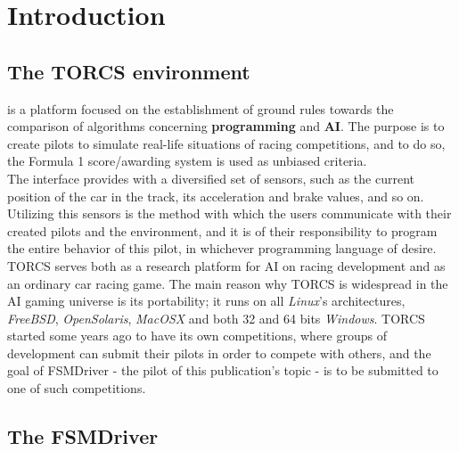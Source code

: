 \section{Introduction}

\subsection{The TORCS environment}

 is a platform focused on the establishment of ground rules towards the comparison of algorithms concerning \textbf{programming} and \textbf{AI}. The purpose is to create pilots to simulate real-life situations of racing competitions, and to do so, the Formula 1 score/awarding system is used as unbiased criteria.\\
The interface provides with a diversified set of sensors, such as the current position of the car in the track, its acceleration and brake values, and so on. Utilizing this sensors is the method with which the users communicate with their created pilots and the environment, and it is of their responsibility to program the entire behavior of this pilot, in whichever programming language of desire.\\
TORCS serves both as a research platform for AI on racing development and as an ordinary car racing game. The main reason why TORCS is widespread in the AI gaming universe is its portability; it runs on all \textit{Linux}'s architectures, \textit{FreeBSD}, \textit{OpenSolaris}, \textit{MacOSX} and both 32 and 64 bits \textit{Windows}. TORCS started some years ago to have its own competitions, where groups of development can submit their pilots in order to compete with others, and the goal of FSMDriver - the pilot of this publication's topic - is to be submitted to one of such competitions.

\subsection{The FSMDriver}

